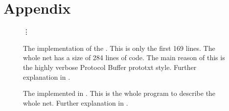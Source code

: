 \chapter{Appendix}
\vspace*{-4em}
\begin{figure}[H]
\begin{minipage}[t]{0.33\textwidth}
	
\end{minipage}
\begin{minipage}[t]{0.33\textwidth}
	
\end{minipage}
\begin{minipage}[t]{0.33\textwidth}
	
	\hspace*{2cm}\vdots
\end{minipage}

\caption{The \caffe implementation of the \alexnet. This is only the first 169 lines. The whole net has a size of 284 lines of code. The main reason of this is the highly verbose Protocol Buffer prototxt style. Further explanation in . \cite{CaffeAlexNetGithub}}
\label{lst: Caffe AlexNet}
\end{figure}

\begin{figure}
	\todoLine
	\hspace*{-0.5cm}
	
	\todoLine
	\caption{The \alexnet implemented in \cnnarch. This is the whole program to describe the whole net. Further explanation in . \cite{CNNArch}}
	\label{lst: CNNArchLang AlexNet}
\end{figure}